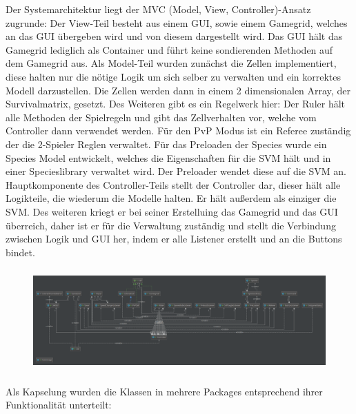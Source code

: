 \documentclass[12pt]{article}
\theoremstyle{plain}
\begin{document}
Der Systemarchitektur liegt der MVC (Model, View, Controller)-Ansatz zugrunde:
Der View-Teil besteht aus einem GUI, sowie einem Gamegrid, welches an das GUI übergeben wird und von diesem dargestellt wird.
Das GUI hält das Gamegrid lediglich als Container und führt keine sondierenden Methoden auf dem Gamegrid aus.
Als Model-Teil wurden zunächst die Zellen implementiert, diese halten nur die nötige Logik um sich selber zu verwalten und ein korrektes Modell darzustellen. Die Zellen werden dann in einem 2 dimensionalen Array, der Survivalmatrix, gesetzt. Des Weiteren gibt es ein Regelwerk hier: Der Ruler hält alle Methoden der Spielregeln und gibt das Zellverhalten vor, welche vom Controller dann verwendet werden. Für den PvP Modus ist ein Referee zuständig der die 2-Spieler Reglen verwaltet. Für das Preloaden der Species wurde ein Species Model entwickelt, welches die Eigenschaften für die SVM hält und in einer Specieslibrary verwaltet wird. Der Preloader wendet diese auf die SVM an.
Hauptkomponente des Controller-Teils stellt der Controller dar, dieser hält alle Logikteile, die wiederum die Modelle halten. Er hält außerdem als einziger die SVM.
Des weiteren kriegt er bei seiner Erstelluing das Gamegrid und das GUI überreich, daher ist er für die Verwaltung zuständig und stellt die Verbindung zwischen Logik und GUI her, indem er alle Listener erstellt und an die Buttons bindet.
\begin{figure}[ht]
\centering
\includegraphics[width=1\textwidth, height=150px]{images/gogolClasses.png}
\end{figure}
\newpage
Als Kapselung wurden die Klassen in mehrere Packages entsprechend ihrer Funktionalität unterteilt:
\end{document}
